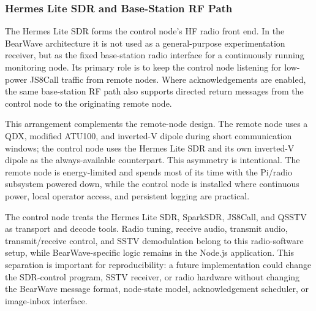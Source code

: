 \documentclass[acmsmall,screen]{acmart}
\begin{document}
\subsubsection{Hermes Lite SDR and Base-Station RF Path}
The Hermes Lite SDR forms the control node's HF radio front end. In the BearWave architecture it is not used as a general-purpose experimentation receiver, but as the fixed base-station radio interface for a continuously running monitoring node. Its primary role is to keep the control node listening for low-power JS8Call traffic from remote nodes. Where acknowledgements are enabled, the same base-station RF path also supports directed return messages from the control node to the originating remote node.

This arrangement complements the remote-node design. The remote node uses a QDX, modified ATU100, and inverted-V dipole during short communication windows; the control node uses the Hermes Lite SDR and its own inverted-V dipole as the always-available counterpart. This asymmetry is intentional. The remote node is energy-limited and spends most of its time with the Pi/radio subsystem powered down, while the control node is installed where continuous power, local operator access, and persistent logging are practical.

The control node treats the Hermes Lite SDR, SparkSDR, JS8Call, and QSSTV as transport and decode tools. Radio tuning, receive audio, transmit audio, transmit/receive control, and SSTV demodulation belong to this radio-software setup, while BearWave-specific logic remains in the Node.js application. This separation is important for reproducibility: a future implementation could change the SDR-control program, SSTV receiver, or radio hardware without changing the BearWave message format, node-state model, acknowledgement scheduler, or image-inbox interface.
\end{document}
